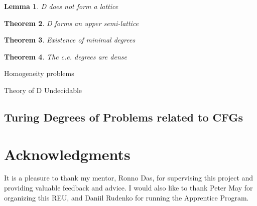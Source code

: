 \documentclass[psamsfonts]{amsart}
\newtheorem{thm}{Theorem}[section]
\newtheorem{lem}[thm]{Lemma}
\theoremstyle{definition}
\theoremstyle{remark}
\numberwithin{equation}{section}
\begin{document}

\begin{lem}
  D does not form a lattice
  \cite{kleene54_upper_semi_lattic_degrees_recur_unsol}
\end{lem}
\begin{thm}
  D forms an upper semi-lattice
  \cite{kleene54_upper_semi_lattic_degrees_recur_unsol}
\end{thm}

\begin{thm}
  Existence of minimal degrees
  \cite{spector56_degrees_recur_unsol}
  \cite{shoenfield66_theor_minim_degrees}
\end{thm}

\begin{thm}
  The c.e. degrees are dense
  \cite{sacks64:_recur_enumer_degrees_dense}
\end{thm}

Homogeneity problems

Theory of D Undecidable

\subsection{Turing Degrees of Problems related to CFGs}
\cite{REEDY197577}




\section*{Acknowledgments}
It is a pleasure to thank my mentor, Ronno Das, for supervising this project and
providing valuable feedback and advice. I would also like to thank Peter May for
organizing this REU, and Daniil Rudenko for running the Apprentice Program.

\printbibliography
\end{document}
